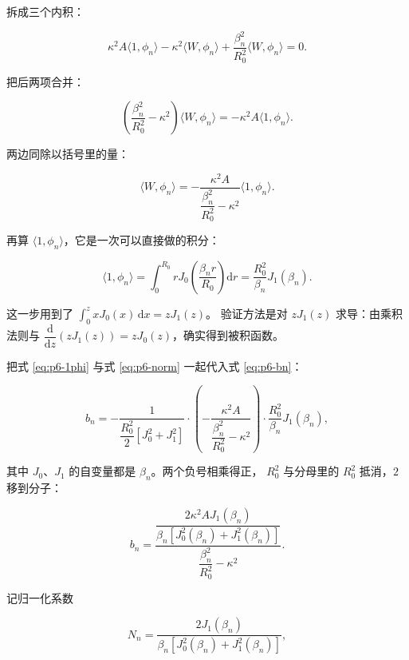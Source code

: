 拆成三个内积：

\begin{equation}
\kappa^2A\langle1,\phi_n\rangle-\kappa^2\langle W,\phi_n\rangle
+\frac{\beta_n^2}{R_0^2}\langle W,\phi_n\rangle=0 .
\end{equation}

把后两项合并：

\begin{equation}
\left(\frac{\beta_n^2}{R_0^2}-\kappa^2\right)\langle W,\phi_n\rangle
=-\kappa^2A\langle1,\phi_n\rangle .
\end{equation}

两边同除以括号里的量：

\begin{equation}
\langle W,\phi_n\rangle
=-\frac{\kappa^2A}{\dfrac{\beta_n^2}{R_0^2}-\kappa^2}\langle1,\phi_n\rangle .
\label{eq:p6-Wphi}
\end{equation}

再算 $\langle1,\phi_n\rangle$，它是一次可以直接做的积分：

\begin{equation}
\langle1,\phi_n\rangle=\int_0^{R_0} r J_0\!\left(\frac{\beta_n r}{R_0}\right)\mathrm{d}r
=\frac{R_0^2}{\beta_n}J_1(\beta_n).
\label{eq:p6-1phi}
\end{equation}

这一步用到了 $\displaystyle\int_0^{z} x J_0(x)\,\mathrm{d}x=z J_1(z)$。
验证方法是对 $zJ_1(z)$ 求导：由乘积法则与
$\dfrac{\mathrm{d}}{\mathrm{d}z}\left(zJ_1(z)\right)=zJ_0(z)$，确实得到被积函数。

把式 \eqref{eq:p6-1phi} 与式 \eqref{eq:p6-norm} 一起代入式 \eqref{eq:p6-bn}：

\begin{equation}
b_n=-\frac{1}{\dfrac{R_0^2}{2}\left[J_0^2+J_1^2\right]}
\cdot\left(-\frac{\kappa^2A}{\dfrac{\beta_n^2}{R_0^2}-\kappa^2}\right)\cdot\frac{R_0^2}{\beta_n}J_1(\beta_n),
\end{equation}

其中 $J_0$、$J_1$ 的自变量都是 $\beta_n$。两个负号相乘得正，
$R_0^2$ 与分母里的 $R_0^2$ 抵消，$2$ 移到分子：

\begin{equation}
b_n=\frac{\dfrac{2\kappa^2A J_1(\beta_n)}{\beta_n\left[J_0^2(\beta_n)+J_1^2(\beta_n)\right]}}{\dfrac{\beta_n^2}{R_0^2}-\kappa^2}.
\end{equation}

记归一化系数

\begin{equation}
N_n=\frac{2J_1(\beta_n)}{\beta_n\left[J_0^2(\beta_n)+J_1^2(\beta_n)\right]},
\label{eq:p6-Nn}
\end{equation}

